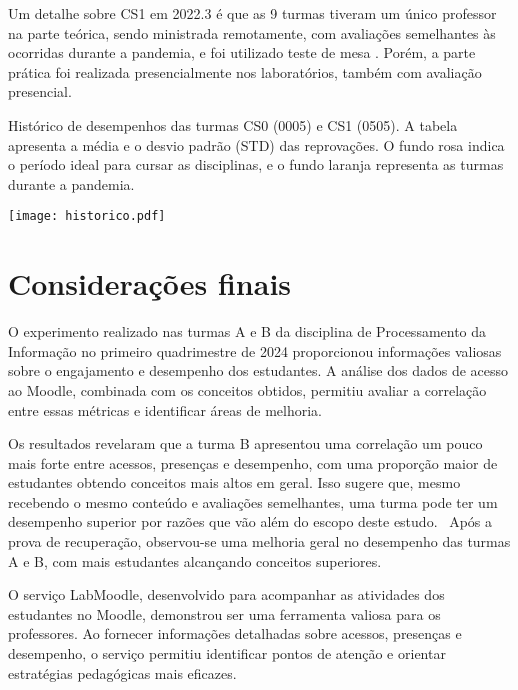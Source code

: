 Um detalhe sobre CS1 em 2022.3 é que as 9 turmas tiveram um único professor na parte teórica, sendo ministrada remotamente, com avaliações semelhantes às ocorridas durante a pandemia, e foi utilizado teste de mesa \cite{2023:Teubl.Zampirolli}. Porém, a parte prática foi realizada presencialmente nos laboratórios, também com avaliação presencial.


\begin{table}[!ht]
    \centering
    \caption{Histórico de desempenhos das turmas CS0 (0005) e CS1 (0505). A tabela apresenta a média e o desvio padrão (STD) das reprovações. O fundo rosa indica o período ideal para cursar as disciplinas, e o fundo laranja representa as turmas durante a pandemia.}
    \hspace*{1cm}
    \texttt{[image: historico.pdf]}
    \label{fig:historicoCS0_1}
\end{table}

\section{Considerações finais}

O experimento realizado nas turmas A e B da disciplina de Processamento da Informação no primeiro quadrimestre de 2024 proporcionou informações valiosas sobre o engajamento e desempenho dos estudantes. A análise dos dados de acesso ao Moodle, combinada com os conceitos obtidos, permitiu avaliar a correlação entre essas métricas e identificar áreas de melhoria.

Os resultados revelaram que a turma B apresentou uma correlação um pouco mais forte entre acessos, presenças e desempenho, com uma proporção maior de estudantes obtendo conceitos mais altos em geral. Isso sugere que, mesmo recebendo o mesmo conteúdo e avaliações semelhantes, uma turma pode ter um desempenho superior por razões que vão além do escopo deste estudo.
\
Após a prova de recuperação, observou-se uma melhoria geral no desempenho das turmas A e B, com mais estudantes alcançando conceitos superiores. 

O serviço LabMoodle, desenvolvido para acompanhar as atividades dos estudantes no Moodle, demonstrou ser uma ferramenta valiosa para os professores. Ao fornecer informações detalhadas sobre acessos, presenças e desempenho, o serviço permitiu identificar pontos de atenção e orientar estratégias pedagógicas mais eficazes.

